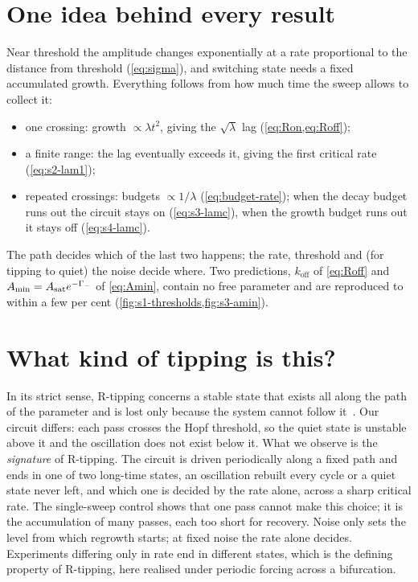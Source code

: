 \section{One idea behind every result}\label{sec:one-idea}

Near threshold the amplitude changes exponentially at a rate proportional to the distance from threshold
(\cref{eq:sigma}), and switching state needs a fixed accumulated growth. Everything follows from how much
time the sweep allows to collect it:
\begin{itemize}
  \item one crossing: growth $\propto\lambda t^{2}$, giving the $\sqrt{\lambda}$ lag
        (\cref{eq:Ron,eq:Roff});
  \item a finite range: the lag eventually exceeds it, giving the first critical rate (\cref{eq:s2-lam1});
  \item repeated crossings: budgets $\propto 1/\lambda$ (\cref{eq:budget-rate}); when the decay budget runs
        out the circuit stays on (\cref{eq:s3-lamc}), when the growth budget runs out it stays off
        (\cref{eq:s4-lamc}).
\end{itemize}
The path decides which of the last two happens; the rate, threshold and (for tipping to quiet) the noise
decide where. Two predictions, $k_{\mathrm{off}}$ of \cref{eq:Roff} and $A_{\min}=A_{\mathrm{sat}} e^{-\Gamma_{-}}$ of
\cref{eq:Amin}, contain no free parameter and are reproduced to within a few per cent
(\cref{fig:s1-thresholds,fig:s3-amin}).

\section{What kind of tipping is this?}\label{sec:what-kind}

In its strict sense, R-tipping concerns a stable state that exists all along the path of the parameter
and is lost only because the system cannot follow it~\cite{Ashwin2012,Wieczorek2023}. Our circuit differs:
each pass crosses the Hopf threshold, so the quiet state is unstable above it and the oscillation does not
exist below it. What we observe is the \emph{signature} of R-tipping. The circuit is driven periodically
along a fixed path and ends in one of two long-time states, an oscillation rebuilt every cycle or a quiet
state never left, and which one is decided by the rate alone, across a sharp critical rate. The
single-sweep control shows that one pass cannot make this choice; it is the accumulation of many passes,
each too short for recovery. Noise only sets the level from which regrowth starts; at fixed noise the rate
alone decides. Experiments differing only in rate end in different states, which is the defining property
of R-tipping, here realised under periodic forcing across a bifurcation.


